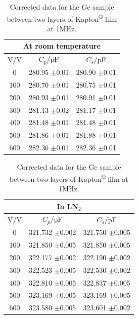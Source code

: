 \documentclass[a4paper,11pt]{article}
\begin{document}
\begin{table}[htbp]
\label{t:KapGec}
\begin{center}
	\caption{Corrected data for the Ge sample between two layers of Kapton\textsuperscript{\copyright} film at 1MHz.}
	
\begin{tabular}{| c | c | c |}
	\hline
	\multicolumn{3}{|c|}{At room temperature}\\
	\hline
		V/V & $C_{p}$/pF & $C_{s}$/pF\\ \hline
		
		0 & 280.95 $\pm$0.01 & 280.90 $\pm$0.01\\ \hline
		100 & 280.70 $\pm$0.01 & 280.75 $\pm$0.01\\ \hline
		200 & 280.93 $\pm$0.01 & 280.91 $\pm$0.01\\ \hline
		300 & 281.13 $\pm$0.02 & 281.17 $\pm$0.01\\ \hline
		400 & 281.48 $\pm$0.01 & 281.48 $\pm$0.01\\ \hline
		500 & 281.86 $\pm$0.01 & 281.88 $\pm$0.01\\ \hline
		600 & 282.36 $\pm$0.01 & 282.36 $\pm$0.01\\
	\hline
\end{tabular}
\hfill
\begin{tabular}{| c | c | c |}
	\hline
	\multicolumn{3}{|c|}{In LN$_{2}$}\\
	\hline
		V/V & $C_{p}$/pF & $C_{s}$/pF\\ \hline
		
		0 & 321.732 $\pm$0.002 & 321.750 $\pm$0.005\\ \hline
		100 & 321.850 $\pm$0.005 & 321.850 $\pm$0.005\\ \hline
		200 & 322.177 $\pm$0.002 & 322.190 $\pm$0.002\\ \hline
		300 & 322.523 $\pm$0.005 & 322.530 $\pm$0.002 \\ \hline
		400 & 322.810 $\pm$0.005 & 322.837 $\pm$0.005\\ \hline
		500 & 323.169 $\pm$0.005 & 323.169 $\pm$0.005 \\ \hline
		600 & 323.580 $\pm$0.005 & 323.601 $\pm$0.002\\
	\hline
\end{tabular}

\end{center}	
\end{table}
\end{document}
